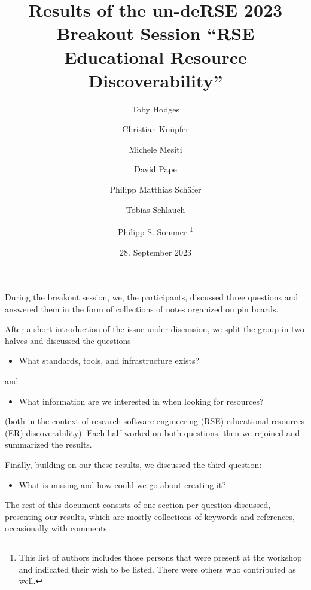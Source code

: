 \documentclass{scrartcl}
\begin{document}
\title{Results of the un-deRSE 2023 Breakout Session “RSE Educational Resource Discoverability”}
\author[1]{Toby Hodges}

\author[2]{Christian Knüpfer}

\author[3]{Michele Mesiti}

\author[4]{David Pape}

\author[2]{Philipp Matthias Schäfer}

\author[5]{Tobias Schlauch}

\author[6]{Philipp S. Sommer \footnote{This list of authors includes those persons that were present at the workshop and indicated their wish to be listed. There were others who contributed as well.}}


\date{28. September 2023}
\maketitle

During the breakout session, we, the participants, discussed three questions and answered them in the form of collections of notes organized on pin boards.

After a short introduction of the issue under discussion, we split the group in two halves and discussed the questions
\begin{itemize}
\item What standards, tools, and infrastructure exists?
\end{itemize}
and
\begin{itemize}
\item What information are we interested in when looking for resources?
\end{itemize}
(both in the context of research software engineering (RSE) educational resources (ER) discoverability).
Each half worked on both questions, then we rejoined and summarized the results.

Finally, building on our these results, we discussed the third question:
\begin{itemize}
\item What is missing and how could we go about creating it?
\end{itemize}

The rest of this document consists of one section per question discussed, presenting our results, which are mostly collections of keywords and references, occasionally with comments.
\end{document}
